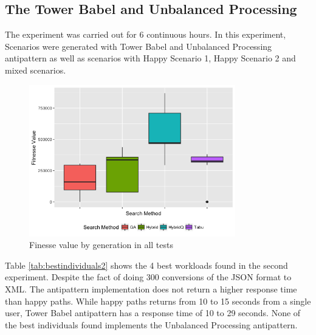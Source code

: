 \documentclass{report}
\begin{document}
\vspace*{-.075in}
\subsection{The Tower Babel  and Unbalanced Processing}
\vspace*{-.075in}

The experiment was carried out for 6 continuous hours. In this experiment, Scenarios were generated with Tower Babel and Unbalanced Processing antipattern as well as scenarios with Happy Scenario 1, Happy Scenario 2 and mixed scenarios.

\begin{figure}[h]
\begin{minipage}{.5\textwidth}
\centering
\includegraphics[width=0.8\textwidth]{./images/experiment2-2.png}
\caption{Finesse value by generation in all tests}
\label{fig:boxplot2}
\end{minipage}
\end{figure}



Table \ref{tab:bestindividuals2} shows the 4 best workloads found in the second experiment. Despite the fact of doing 300 conversions of the JSON format to XML. The antipattern implementation does not return a higher response time than happy paths. While happy paths returns from 10 to 15 seconds from a single user, Tower Babel antipattern has a response time of 10 to 29 seconds. None of the best individuals found implements the Unbalanced Processing antipattern.
\end{document}
